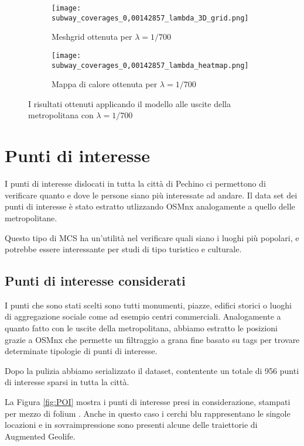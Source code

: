 \begin{figure}[H]
	\centering
	\begin{subfigure}[b]{\linewidth}
		\texttt{[image: subway\_coverages\_0,00142857\_lambda\_3D\_grid.png]}
		\caption{Meshgrid ottenuta per $\lambda = 1/700$}
	\end{subfigure}
	\begin{subfigure}[b]{\linewidth}
		\texttt{[image: subway\_coverages\_0,00142857\_lambda\_heatmap.png]}
		\caption{Mappa di calore ottenuta per $\lambda = 1/700$}
	\end{subfigure}
	\caption[Risultati metropolitana, $\lambda = 1/700$]{I risultati ottenuti applicando il modello alle uscite della metropolitana con $\lambda = 1/700$}
	\label{fig:subway_coverage3}
\end{figure}

\section{Punti di interesse}
I punti di interesse dislocati in tutta la città di Pechino ci permettono di verificare quanto e dove le persone siano più interessate ad andare.
Il data set dei punti di interesse è stato estratto utlizzando OSMnx analogamente a quello delle metropolitane.

Questo tipo di MCS ha un'utilità nel verificare quali siano i luoghi più popolari, e potrebbe essere interessante per studi di tipo turistico e culturale.
\subsection{Punti di interesse considerati
}I punti che sono stati scelti sono tutti monumenti, piazze, edifici storici o luoghi di aggregazione sociale come ad esempio centri commerciali. 
Analogamente a quanto fatto con le uscite della metropolitana, abbiamo estratto le posizioni grazie a OSMnx \cite{osmnx} che permette un filtraggio a grana fine basato su tags per trovare determinate tipologie di punti di interesse.

Dopo la pulizia abbiamo serializzato il dataset, contentente un totale di 956 punti di interesse sparsi in tutta la città.

La Figura \ref{fig:POI} mostra i punti di interesse presi in considerazione, stampati per mezzo di folium \cite{folium}.
Anche in questo caso i cerchi blu rappresentano le singole locazioni e in sovraimpressione sono presenti alcune delle traiettorie di Augmented Geolife.

